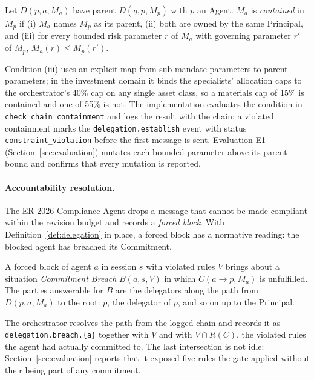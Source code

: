 \documentclass[runningheads]{llncs}
\newcommand{\code}[1]{\texttt{#1}}
\begin{document}
\begin{definition}
\label{def:containment}
Let $D(p, a, M_a)$ have parent $D(q, p, M_p)$ with $p$ an Agent. $M_a$ is \emph{contained} in $M_p$ if (i) $M_a$ names $M_p$ as its parent, (ii) both are owned by the same Principal, and (iii) for every bounded risk parameter $r$ of $M_a$ with governing parameter $r'$ of $M_p$, $M_a(r) \le M_p(r')$.
\end{definition}

Condition (iii) uses an explicit map from sub-mandate parameters to parent parameters; in the investment domain it binds the specialists' allocation caps to the orchestrator's 40\% cap on any single asset class, so a materials cap of 15\% is contained and one of 55\% is not. The implementation evaluates the condition in \code{check\_chain\_containment} and logs the result with the chain; a violated containment marks the \code{delegation.establish} event with status \code{constraint\_violation} before the first message is sent. Evaluation E1 (Section~\ref{sec:evaluation}) mutates each bounded parameter above its parent bound and confirms that every mutation is reported.

\paragraph{Accountability resolution.}
The ER 2026 Compliance Agent drops a message that cannot be made compliant within the revision budget and records a \emph{forced block}. With Definition~\ref{def:delegation} in place, a forced block has a normative reading: the blocked agent has breached its Commitment.

\begin{definition}
\label{def:breach}
A forced block of agent $a$ in session $s$ with violated rules $V$ brings about a situation \emph{Commitment Breach} $B(a, s, V)$ in which $C(a \to p, M_a)$ is unfulfilled. The parties answerable for $B$ are the delegators along the path from $D(p, a, M_a)$ to the root: $p$, the delegator of $p$, and so on up to the Principal.
\end{definition}

The orchestrator resolves the path from the logged chain and records it as \code{delegation.breach.\{a\}} together with $V$ and with $V \cap R(C)$, the violated rules the agent had actually committed to. The last intersection is not idle: Section~\ref{sec:evaluation} reports that it exposed five rules the gate applied without their being part of any commitment.
\end{document}
